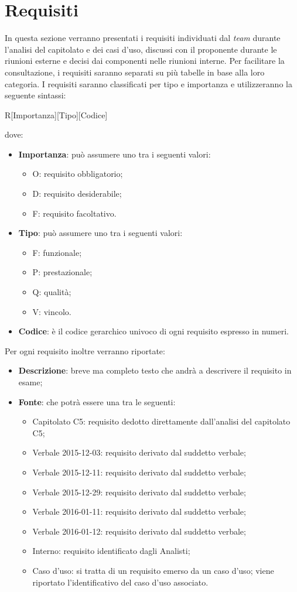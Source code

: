 \newpage
\section{Requisiti}
In questa sezione verranno presentati i requisiti individuati dal \textit{team} durante l'analisi del capitolato e dei casi d'uso, discussi con il proponente durante le riunioni esterne e decisi dai componenti nelle riunioni interne. Per facilitare la consultazione, i
requisiti saranno separati su più tabelle in base alla loro categoria. I requisiti saranno classificati per tipo
e importanza e utilizzeranno la seguente sintassi:
\begin{center}
	R[Importanza][Tipo][Codice]
\end{center}
dove:
\begin{itemize}
	\item \textbf{Importanza}: può assumere uno tra i seguenti valori:
	\begin{itemize}
		\item O: requisito obbligatorio;
		\item D: requisito desiderabile;
		\item F: requisito facoltativo.
	\end{itemize}
	\item \textbf{Tipo}: può assumere uno tra i seguenti valori:
	\begin{itemize}
		\item F: funzionale;
		\item P: prestazionale;
		\item Q: qualità;
		\item V: vincolo.
	\end{itemize}
	\item \textbf{Codice}: è il codice gerarchico univoco di ogni requisito espresso in numeri.
\end{itemize} 
Per ogni requisito inoltre verranno riportate:
\begin{itemize}
	\item \textbf{Descrizione}: breve ma completo testo che andrà a descrivere il requisito in esame;
	\item \textbf{Fonte}: che potrà essere una tra le seguenti:
	\begin{itemize}
		\item Capitolato C5: requisito dedotto direttamente dall'analisi del capitolato C5;
		\item Verbale 2015-12-03: requisito derivato dal suddetto verbale;
		\item Verbale 2015-12-11: requisito derivato dal suddetto verbale;
		\item Verbale 2015-12-29: requisito derivato dal suddetto verbale;
		\item Verbale 2016-01-11: requisito derivato dal suddetto verbale;
		\item Verbale 2016-01-12: requisito derivato dal suddetto verbale;
		\item Interno: requisito identificato dagli Analisti;
		\item Caso d’uso: si tratta di un requisito emerso da un caso d’uso; viene riportato l’identificativo del caso d’uso associato.
	\end{itemize} 
\end{itemize}




